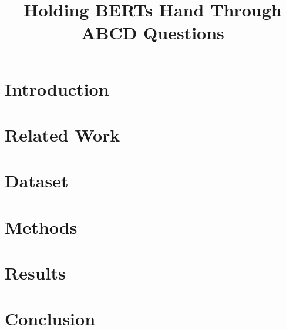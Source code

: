 \documentclass[10pt, a4paper]{article}
\title{Holding BERTs Hand Through ABCD Questions}
\begin{document}
\maketitleabstract

\section{Introduction} \label{intro}


\section{Related Work}
 \label{related-work}

\section{Dataset} \label{dataset}




\section{Methods} \label{approach}


\section{Results} \label{results}


\section{Conclusion}
 \label{conclusion}


 
\end{document}
